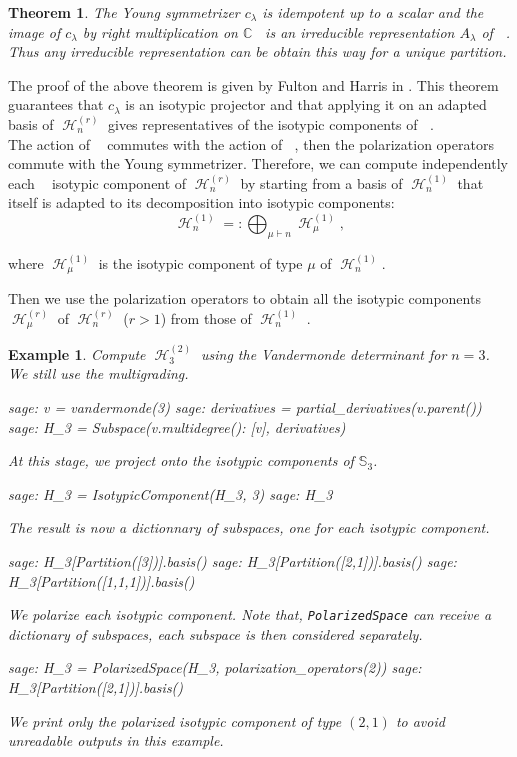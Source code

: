 \documentclass[letter,12pt]{article}
\newcommand{\pauline}[1]{\todo[linecolor=blue,backgroundcolor=cyan!25,bordercolor=blue]{#1}}
\newcommand{\CC}{\mathbb{C}}
\newcommand{\Sym}[1]{\mathbb{S}_{#1}}
\DeclareMathOperator{\Sn}{\mathbb{S}_n}
\DeclareMathOperator{\GLr}{GL_r}
\DeclareMathOperator{\harmonics}{\mathcal{H}}
\newtheorem{theorem}{Theorem}
\newtheorem{example}{Example}
\begin{document}
	\begin{theorem}
		The Young symmetrizer $c_{\lambda}$ is idempotent up to a scalar and the image of $c_{\lambda}$ by right multiplication on $\CC \Sn$ is an irreducible representation $A_{\lambda}$ of $\Sn$.
		Thus any irreducible representation can be obtain this way for a unique partition. 
	\end{theorem}
	
	The proof of the above theorem is given by Fulton and Harris in \cite{FultonHarris1991}. 
	This theorem guarantees that $c_{\lambda}$ is an isotypic projector and that applying it on an adapted basis of $\harmonics_{n}^{(r)}$ gives representatives of the isotypic components of $\Sn$. \pauline{Need more details here.}  \\
	
	The action of $\GLr$ commutes with the action of $\Sn$, then the polarization operators commute with the Young symmetrizer. Therefore, we can compute independently each $\Sn$ isotypic component of $\harmonics_{n}^{(r)}$ by starting from a basis of $\harmonics_{n}^{(1)}$ that itself is adapted to its decomposition into isotypic components:
	$$\harmonics_{n}^{(1)}=:\bigoplus_{\mu \vdash n} \harmonics_{\mu}^{(1)},$$
	
	where $\harmonics_{\mu}^{(1)}$ is the isotypic component of type $\mu$ of $\harmonics_{n}^{(1)}$.
	
	Then we use the polarization operators to obtain all the isotypic components $\harmonics_{\mu}^{(r)}$ of $\harmonics_n^{(r)}$ ($r>1$) from those of $\harmonics_n^{(1)}$ .
	
	\begin{example} \label{multigrading}
		Compute $\harmonics_3^{(2)}$ using the Vandermonde determinant for $n=3$. We still use the multigrading. 
		\begin{sagecommandline}
			sage: v = vandermonde(3)
			sage: derivatives = partial_derivatives(v.parent())
			sage: H_3 = Subspace({v.multidegree(): [v]}, derivatives)
		\end{sagecommandline}
		At this stage, we project onto the isotypic components of $\Sym{3}$.
		\begin{sagecommandline}
			sage: H_3 = IsotypicComponent(H_3, 3)
			sage: H_3
		\end{sagecommandline}
		The result is now a dictionnary of subspaces, one for each isotypic component.
		\begin{sagecommandline}
			sage: H_3[Partition([3])].basis()
			sage: H_3[Partition([2,1])].basis()
			sage: H_3[Partition([1,1,1])].basis()
		\end{sagecommandline}
		We polarize each isotypic component. Note that, \texttt{PolarizedSpace} can receive a dictionary of subspaces, each subspace is then considered separately. 
		\begin{sagecommandline}
			sage: H_3 = PolarizedSpace(H_3, polarization_operators(2))
			sage: H_3[Partition([2,1])].basis()
		\end{sagecommandline}
	We print only the polarized isotypic component of type $(2,1)$ to avoid unreadable outputs in this example. 	
	\end{example}
		
\end{document}
